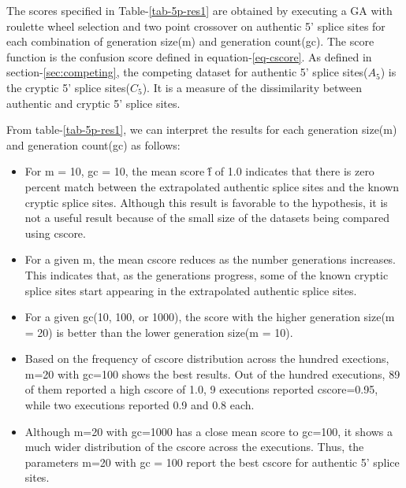 The scores specified in Table-\ref{tab-5p-res1} are obtained by executing a GA with roulette wheel selection and two point crossover on authentic 5' splice sites for each combination of generation size(m) and generation count(gc). The score function is the confusion score defined in equation-\ref{eq-cscore}. As defined in section-\ref{sec:competing}, the competing dataset for authentic 5' splice sites($A_5$) is the cryptic 5' splice sites($C_5$). It is a measure of the dissimilarity between authentic and cryptic 5' splice sites. \par
From table-\ref{tab-5p-res1}, we can interpret the results for each generation size(m) and generation count(gc) as follows:
\begin{itemize}
	\item For m = 10, gc = 10, the mean score \^{f} of 1.0 indicates that there is zero percent match between the extrapolated authentic splice sites and the known cryptic splice sites. Although this result is favorable to the hypothesis, it is not a useful result because of the small size of the datasets being compared using cscore.
	\item For a given m, the mean cscore reduces as the number generations increases. This indicates that, as the generations progress, some of the known cryptic splice sites start appearing in the extrapolated authentic splice sites.
	\item For a given gc(10, 100, or 1000), the score with the higher generation size(m = 20) is better than the lower generation size(m = 10).
	\item Based on the frequency of cscore distribution across the hundred exections, m=20 with gc=100 shows the best results. Out of the hundred executions, 89 of them reported a high cscore of 1.0, 9 executions reported cscore=0.95, while two executions reported 0.9 and 0.8 each.
	\item Although m=20 with gc=1000 has a close mean score to gc=100, it shows a much wider distribution of the cscore across the executions. Thus, the parameters m=20 with gc = 100 report the best cscore for authentic 5' splice sites.
\end{itemize} 

